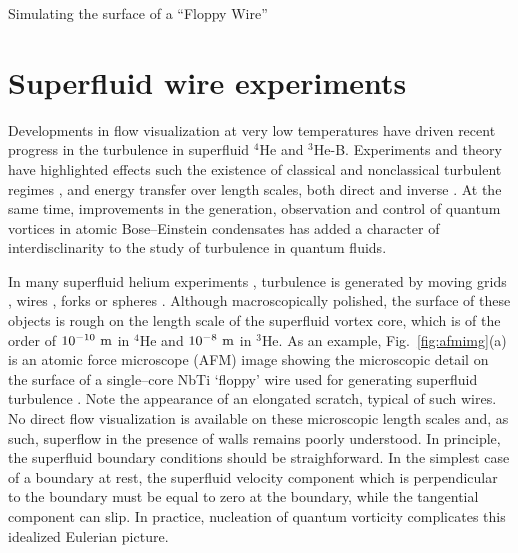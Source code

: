 \begin{chapter}{\label{cha:afm}Simulating the surface of a ``Floppy Wire''}
\section{\label{section:sfwire} Superfluid wire experiments}
Developments in flow visualization at very low temperatures
\cite{Guo2014,Fisher2014} have
driven recent progress in the turbulence in superfluid $^4$He and
$^3$He-B. Experiments and theory have highlighted effects
such the existence of classical and
nonclassical turbulent regimes \cite{WalmsleyGolov2008}, and
energy transfer over length scales, both
direct \cite{Barenghi2014} and inverse
\cite{WalmsleyTompsett2013,Baggaley2014}.
At the same time, improvements in the generation, observation and control of quantum
vortices in atomic Bose--Einstein condensates\cite{Henn,Freilich2010,aioi11,neely_bradley_13,kwon_moon_14}
has added a character of interdisclinarity to the study of
turbulence in quantum fluids.

In many superfluid helium experiments \cite{VinenSkrbek2008}, turbulence
is generated by moving grids \cite{Davis2000},
wires \cite{Guenault1986,brad05,Bradley2011,Fisher2001,goto08},
forks \cite{Blaauwgeers2007,Bradley2012} or spheres \cite{Schoepe1995}.
Although macroscopically polished, the surface of these objects is
rough on the length scale of the superfluid vortex core, which is of
the order of $10^{-10}~\rm m$ in $^4$He
and $10^{-8}~\rm m$ in $^3$He.  As an example, Fig.~\ref{fig:afmimg}(a) is an atomic force microscope (AFM) image showing the microscopic detail on the surface of a  single--core NbTi `floppy' wire used for generating superfluid turbulence  \cite{Bradley2011}.  Note the appearance of an elongated scratch, typical of such wires.  No direct flow visualization is available on these microscopic length scales and, as such, 
superflow in the presence of walls remains poorly understood. In principle, the superfluid boundary conditions should
be straighforward.
In the simplest case of a boundary at rest, the superfluid velocity
component which is perpendicular to the boundary must be equal to
zero at the boundary, while the tangential component can slip.
In practice, nucleation of quantum vorticity complicates
this idealized Eulerian picture.


\end{chapter}
